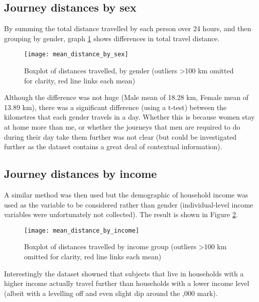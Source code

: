 \subsection{Journey distances by sex}
\label{sec:journey_distances_by_sex}

By summing the total distance travelled by each person over 24 hours, and then grouping by gender, graph \ref{fig:mean_distance_by_sex} shows differences in total travel distance.

\begin{figure}[H]
\centering
\texttt{[image: mean\_distance\_by\_sex]}
\caption{Boxplot of distances travelled, by gender (outliers \textgreater 100 km omitted for clarity, red line links each mean)}
\label{fig:mean_distance_by_sex}
\end{figure}

Although the difference was not huge (Male mean of 18.28 km, Female mean of 13.89 km), there was a significant difference (using a t-test) between the kilometres that each gender travels in a day. Whether this is because women stay at home more than me, or whether the journeys that men are required to do during their day take them further was not clear (but could be investigated further as the dataset contains a great deal of contextual information).

\subsection{Journey distances by income}
\label{sec:journey_distances_by_income}

A similar method was then used but the demographic of household income was used as the variable to be considered rather than gender (individual-level income variables were unfortunately not collected). The result is shown in Figure \ref{fig:mean_distance_by_income}.

\begin{figure}[H]
\centering
\texttt{[image: mean\_distance\_by\_income]}
\caption{Boxplot of distances travelled by income group  (outliers \textgreater 100 km omitted for clarity, red line links each mean)}
\label{fig:mean_distance_by_income}
\end{figure}

Interestingly the dataset showned that subjects that live in households with a higher income actually travel further than households with a lower income level (albeit with a levelling off and even slight dip around the ,000 mark).

